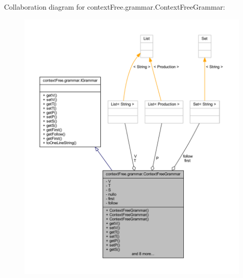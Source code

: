 Collaboration diagram for context\-Free.\-grammar.\-Context\-Free\-Grammar\-:\nopagebreak
\begin{figure}[H]
\begin{center}
\leavevmode
\includegraphics[width=350pt]{classcontext_free_1_1grammar_1_1_context_free_grammar__coll__graph}
\end{center}
\end{figure}
